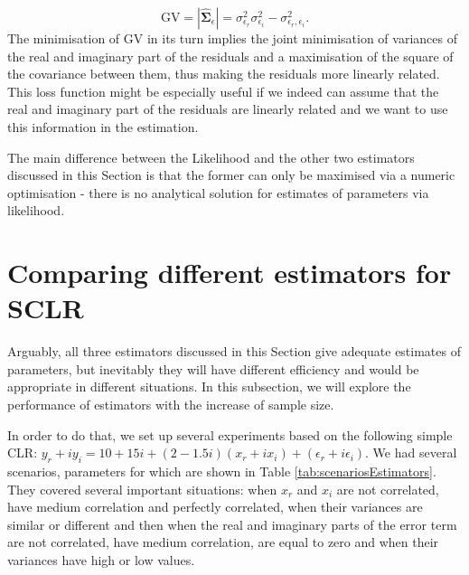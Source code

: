 \documentclass[
]{book}
\begin{document}
\begin{equation}
    \mathrm{GV} = |\hat{\boldsymbol{\Sigma}}_\epsilon| = \sigma_{\epsilon_r}^2 \sigma_{\epsilon_i}^2 - \sigma_{\epsilon_r, \epsilon_i}^2 .
    \label{eq:additiveLogLikConcentratedGV}
\end{equation}
The minimisation of GV in its turn implies the joint minimisation of variances of the real and imaginary part of the residuals and a maximisation of the square of the covariance between them, thus making the residuals more linearly related. This loss function might be especially useful if we indeed can assume that the real and imaginary part of the residuals are linearly related and we want to use this information in the estimation.

The main difference between the Likelihood and the other two estimators discussed in this Section is that the former can only be maximised via a numeric optimisation - there is no analytical solution for estimates of parameters via likelihood.

\hypertarget{comparing-different-estimators-for-sclr}{%
\section{Comparing different estimators for SCLR}\label{comparing-different-estimators-for-sclr}}

Arguably, all three estimators discussed in this Section give adequate estimates of parameters, but inevitably they will have different efficiency and would be appropriate in different situations. In this subsection, we will explore the performance of estimators with the increase of sample size.

In order to do that, we set up several experiments based on the following simple CLR: \(y_r + i y_i = 10+15i + (2-1.5i) (x_r + i x_i) + (\epsilon_r + i \epsilon_i)\). We had several scenarios, parameters for which are shown in Table \ref{tab:scenariosEstimators}. They covered several important situations: when \(x_r\) and \(x_i\) are not correlated, have medium correlation and perfectly correlated, when their variances are similar or different and then when the real and imaginary parts of the error term are not correlated, have medium correlation, are equal to zero and when their variances have high or low values.
\end{document}
